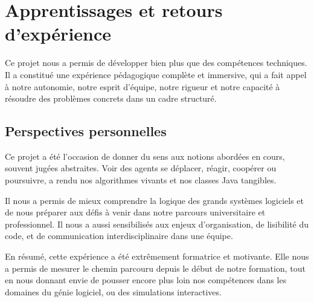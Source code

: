 

\section{Apprentissages et retours d'expérience}

Ce projet nous a permis de développer bien plus que des compétences techniques. Il a constitué une expérience pédagogique complète et immersive, qui a fait appel à notre autonomie, notre esprit d’équipe, notre rigueur et notre capacité à résoudre des problèmes concrets dans un cadre structuré.



\subsection{Perspectives personnelles}

Ce projet a été l’occasion de donner du sens aux notions abordées en cours, souvent jugées abstraites. Voir des agents se déplacer, réagir, coopérer ou poursuivre, a rendu nos algorithmes vivants et nos classes Java tangibles.

Il nous a permis de mieux comprendre la logique des grands systèmes logiciels et de nous préparer aux défis à venir dans notre parcours universitaire et professionnel. Il nous a aussi sensibilisés aux enjeux d’organisation, de lisibilité du code, et de communication interdisciplinaire dans une équipe.

En résumé, cette expérience a été extrêmement formatrice et motivante. Elle nous a permis de mesurer le chemin parcouru depuis le début de notre formation, tout en nous donnant envie de pousser encore plus loin nos compétences dans les domaines du génie logiciel, ou des simulations interactives.